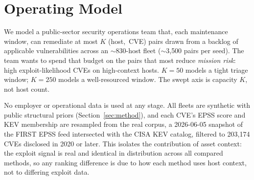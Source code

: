 \section{Operating Model}
\label{sec:model}

We model a public-sector security operations team that, each maintenance window, can
remediate at most $K$ \mbox{(host, CVE)} pairs drawn from a backlog of applicable
vulnerabilities across an $\sim$830-host fleet ($\sim$3{,}500 pairs per seed). The team
wants to spend that budget on the pairs that most reduce \emph{mission risk}: high
exploit-likelihood CVEs on high-context hosts. $K=50$ models a tight triage window;
$K=250$ models a well-resourced window. The swept axis is capacity $K$, not host count.

No employer or operational data is used at any stage. All fleets are synthetic with
public structural priors (Section~\ref{sec:method}), and each CVE's EPSS score and KEV
membership are resampled from the real corpus, a 2026-06-05 snapshot of the FIRST EPSS
feed intersected with the CISA KEV catalog, filtered to 203{,}174 CVEs disclosed in 2020
or later. This isolates the contribution of asset context: the exploit signal is real and
identical in distribution across all compared methods, so any ranking difference is due to
how each method uses host context, not to differing exploit data.
